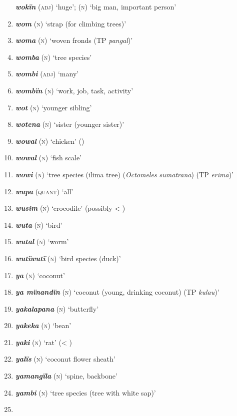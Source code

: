 \begin{enumerate}[noitemsep, label={}, align=left, widest=190, labelsep=1ex,leftmargin=*,itemindent=-10pt]
\textbf{\textit{wokïn}} (\textsc{adj}) ‘huge’; (\textsc{n}) ‘big man, important person’ \item
\textbf{\textit{wom}} (\textsc{n}) ‘strap (for climbing trees)’ \item
\textbf{\textit{woma}} (\textsc{n}) ‘woven fronds (TP \textit{pangal})’ \item
\textbf{\textit{womba}} (\textsc{n}) ‘tree species’ \item
\textbf{\textit{wombi}} (\textsc{adj}) ‘many’ \item
\textbf{\textit{wombïn}} (\textsc{n}) ‘work, job, task, activity’ \item
\textbf{\textit{wot}} (\textsc{n}) ‘younger sibling’ \item
\textbf{\textit{wotena}} (\textsc{n}) ‘sister (younger sister)’ \item
\textbf{\textit{wowal}} (\textsc{n}) ‘chicken’ () \item
\textbf{\textit{wowal}} (\textsc{n}) ‘fish scale’ \item
\textbf{\textit{wowi}} (\textsc{n}) ‘tree species (ilima tree) (\textit{Octomeles sumatrana}) (TP \textit{erima})’ \item
\textbf{\textit{wupa}} (\textsc{quant}) ‘all’ \item
\textbf{\textit{wusim}} (\textsc{n}) ‘crocodile’ (possibly < ) \item
\textbf{\textit{wuta}} (\textsc{n}) ‘bird’ \item
\textbf{\textit{wutal}} (\textsc{n}) ‘worm’ \item
\textbf{\textit{wutïwutï}} (\textsc{n}) ‘bird species (duck)’ \item
\textbf{\textit{ya}} (\textsc{n}) ‘coconut’ \item
\textbf{\textit{ya mïnandïn}} (\textsc{n}) ‘coconut (young, drinking coconut) (TP \textit{kulau})’ \item
\textbf{\textit{yakalapana}} (\textsc{n}) ‘butterfly’ \item
\textbf{\textit{yakeka}} (\textsc{n}) ‘bean’ \item
\textbf{\textit{yaki}} (\textsc{n}) ‘rat’ (< ) \item
\textbf{\textit{yalïs}} (\textsc{n}) ‘coconut flower sheath’ \item
\textbf{\textit{yamangïla}} (\textsc{n}) ‘spine, backbone’ \item
\textbf{\textit{yambi}} (\textsc{n}) ‘tree species (tree with white sap)’ \item

\end{enumerate}

